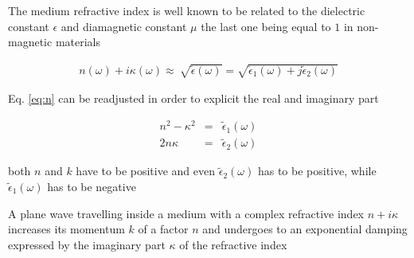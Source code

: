 
The medium refractive index is well known to be related to the dielectric constant $\epsilon$ and diamagnetic constant $\mu$ the last one being equal to $1$ in non-magnetic materials





\begin{eqnarray}\label{eq:n}
	n(\omega) + i\kappa(\omega) \approx\ \sqrt{ \widetilde{\epsilon}(\omega) } = \sqrt{ \widetilde{\epsilon}_1(\omega) + j\widetilde{\epsilon}_2(\omega)}
\end{eqnarray}



Eq. \ref{eq:n} can be readjusted in order to explicit the real and imaginary part

\begin{eqnarray}\label{eq:n_epsilon}
	n^2 - \kappa^2 & = & \widetilde{\epsilon}_1(\omega)\\
	2n\kappa & = & \widetilde{\epsilon}_2(\omega)
\end{eqnarray}

both $n$ and $k$ have to be positive and even $\widetilde{\epsilon}_2(\omega)$ has to be positive, while $\widetilde{\epsilon}_1(\omega)$ has to be negative



A plane wave  travelling inside a medium with a complex refractive index $n+i\kappa$ increases its momentum $k$ of a factor $n$ and undergoes to an exponential damping expressed by the imaginary part $\kappa$ of the refractive index



